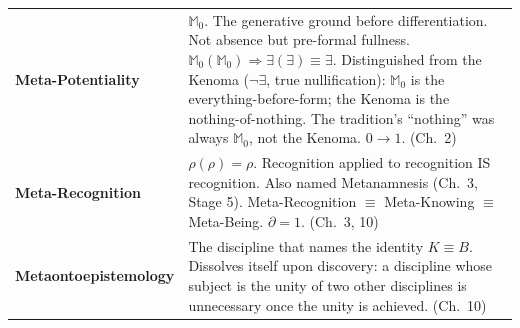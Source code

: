 \documentclass[10pt, openany, oneside]{book}
\begin{document}
{\begin{tabular}{@{} l @{\hspace{0.6em}} p{} @{}}
\textbf{Meta-Potentiality} & $\mathbb{M}_0$. The generative ground before differentiation. Not absence but pre-formal fullness. $\mathbb{M}_0(\mathbb{M}_0) \Rightarrow \exists(\exists) \equiv \exists$. Distinguished from the Kenoma ($\neg\exists$, true nullification): $\mathbb{M}_0$ is the everything-before-form; the Kenoma is the nothing-of-nothing. The tradition's ``nothing'' was always $\mathbb{M}_0$, not the Kenoma. $0 \to 1$. (Ch.\ 2) \\[0.3em]
\textbf{Meta-Recognition} & $\rho(\rho) = \rho$. Recognition applied to recognition IS recognition. Also named Metanamnesis (Ch.\ 3, Stage 5). Meta-Recognition $\equiv$ Meta-Knowing $\equiv$ Meta-Being. $\partial = 1$. (Ch.\ 3, 10) \\[0.3em]
\textbf{Metaontoepistemology} & The discipline that names the identity $K \equiv B$. Dissolves itself upon discovery: a discipline whose subject is the unity of two other disciplines is unnecessary once the unity is achieved. (Ch.\ 10) \\[0.3em]
\end{tabular}
}

\newpage
\end{document}

